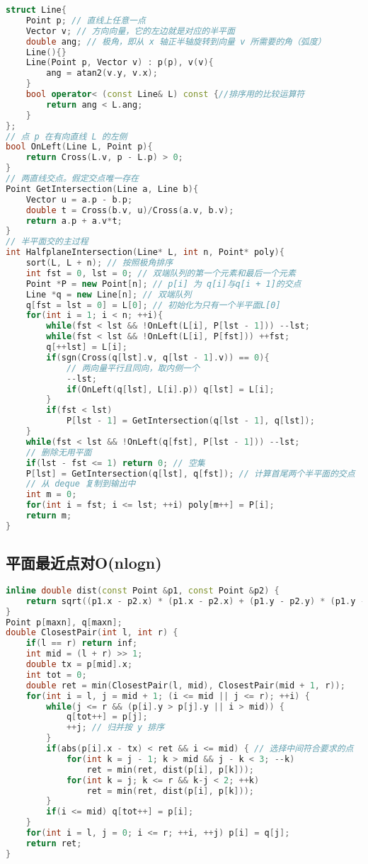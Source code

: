 \begin{lstlisting}[language=C++]
struct Line{
    Point p; // 直线上任意一点
    Vector v; // 方向向量，它的左边就是对应的半平面
    double ang; // 极角，即从 x 轴正半轴旋转到向量 v 所需要的角（弧度）
    Line(){}
    Line(Point p, Vector v) : p(p), v(v){
        ang = atan2(v.y, v.x);
    }
    bool operator< (const Line& L) const {//排序用的比较运算符
        return ang < L.ang;
    }
};
// 点 p 在有向直线 L 的左侧
bool OnLeft(Line L, Point p){
    return Cross(L.v, p - L.p) > 0;
}
// 两直线交点。假定交点唯一存在
Point GetIntersection(Line a, Line b){
    Vector u = a.p - b.p;
    double t = Cross(b.v, u)/Cross(a.v, b.v);
    return a.p + a.v*t;
}
// 半平面交的主过程
int HalfplaneIntersection(Line* L, int n, Point* poly){
    sort(L, L + n); // 按照极角排序
    int fst = 0, lst = 0; // 双端队列的第一个元素和最后一个元素
    Point *P = new Point[n]; // p[i] 为 q[i]与q[i + 1]的交点
    Line *q = new Line[n]; // 双端队列
    q[fst = lst = 0] = L[0]; // 初始化为只有一个半平面L[0]
    for(int i = 1; i < n; ++i){
        while(fst < lst && !OnLeft(L[i], P[lst - 1])) --lst;
        while(fst < lst && !OnLeft(L[i], P[fst])) ++fst;
        q[++lst] = L[i];
        if(sgn(Cross(q[lst].v, q[lst - 1].v)) == 0){
            // 两向量平行且同向，取内侧一个
            --lst;
            if(OnLeft(q[lst], L[i].p)) q[lst] = L[i];
        }
        if(fst < lst)
            P[lst - 1] = GetIntersection(q[lst - 1], q[lst]);
    }
    while(fst < lst && !OnLeft(q[fst], P[lst - 1])) --lst;
    // 删除无用平面
    if(lst - fst <= 1) return 0; // 空集
    P[lst] = GetIntersection(q[lst], q[fst]); // 计算首尾两个半平面的交点
    // 从 deque 复制到输出中
    int m = 0;
    for(int i = fst; i <= lst; ++i) poly[m++] = P[i];
    return m;
}
\end{lstlisting}

\subsection{平面最近点对O(nlogn)}

\begin{lstlisting}[language=C++]
inline double dist(const Point &p1, const Point &p2) {
    return sqrt((p1.x - p2.x) * (p1.x - p2.x) + (p1.y - p2.y) * (p1.y - p2.y));
}
Point p[maxn], q[maxn];
double ClosestPair(int l, int r) {
    if(l == r) return inf;
    int mid = (l + r) >> 1;
    double tx = p[mid].x;
    int tot = 0;
    double ret = min(ClosestPair(l, mid), ClosestPair(mid + 1, r));
    for(int i = l, j = mid + 1; (i <= mid || j <= r); ++i) {
        while(j <= r && (p[i].y > p[j].y || i > mid)) {
            q[tot++] = p[j];
            ++j; // 归并按 y 排序
        }
        if(abs(p[i].x - tx) < ret && i <= mid) { // 选择中间符合要求的点
            for(int k = j - 1; k > mid && j - k < 3; --k)
                ret = min(ret, dist(p[i], p[k]));
            for(int k = j; k <= r && k-j < 2; ++k)
                ret = min(ret, dist(p[i], p[k]));
        }
        if(i <= mid) q[tot++] = p[i];
    }
    for(int i = l, j = 0; i <= r; ++i, ++j) p[i] = q[j];
    return ret;
}
\end{lstlisting}

